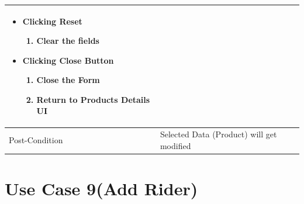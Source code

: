 \documentclass[12pt,a4paper]{report}
\begin{document}
\begin{tabular}{ | m{3cm} | m{12cm}| }
\begin{itemize}
\begin{enumerate}
	\end{enumerate}
\item Clicking Reset
	\begin{enumerate}
	   	 \item	Clear the fields
	\end{enumerate}
\item Clicking Close Button
	\begin{enumerate}
		\item Close the Form
		\item Return to Products Details UI
	\end{enumerate}
\end{itemize}
\\ \hline
Post-Condition &  Selected Data (Product) will get modified  \\ \hline

\end{tabular}
\section{ Use Case 9(Add Rider)}
\end{document}
